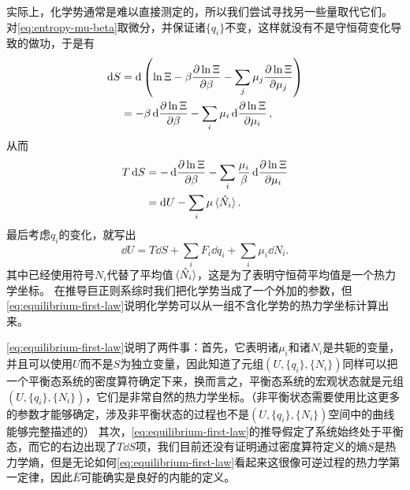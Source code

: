 \documentclass[hyperref, UTF8, a4paper]{ctexart}
\begin{document}
实际上，化学势通常是难以直接测定的，所以我们尝试寻找另一些量取代它们。
对\eqref{eq:entropy-mu-beta}取微分，并保证诸$\{q_i\}$不变，这样就没有不是守恒荷变化导致的做功，于是有
\[
    \begin{aligned}
        \dd{S} &= \dd{\left(\ln \Xi - \beta \pdv{\ln \Xi}{\beta} - \sum_j \mu_j \pdv{\ln \Xi}{\mu_j}\right)} \\
        &= - \beta \dd{\pdv{\ln \Xi}{\beta}} - \sum_i \mu_i \dd{\pdv{\ln \Xi}{\mu_i}},
    \end{aligned}
\]
从而
\[
    \begin{aligned}
        T \dd{S} &= - \dd{\pdv{\ln \Xi}{\beta}} - \sum_i \frac{\mu_i}{\beta} \dd{\pdv{\ln \Xi}{\mu_i}} \\
        &= \dd{U} - \sum_i \mu \expval*{\hat{N}_i}.
    \end{aligned}
\]
最后考虑$q_i$的变化，就写出
\begin{equation}
    \dd{U} = T \dd{S} + \sum_i F_i \dd{q_i} + \sum_i \mu_i \dd{N_i}.
    \label{eq:equilibrium-first-law}
\end{equation}
其中已经使用符号$N_i$代替了平均值$\expval*{\hat{N}_i}$，这是为了表明守恒荷平均值是一个热力学坐标。
在推导巨正则系综时我们把化学势当成了一个外加的参数，但\eqref{eq:equilibrium-first-law}说明化学势可以从一组不含化学势的热力学坐标计算出来。

\eqref{eq:equilibrium-first-law}说明了两件事：首先，它表明诸$\mu_i$和诸$N_i$是共轭的变量，并且可以使用$U$而不是$S$为独立变量，因此知道了元组$(U, \{q_i\}, \{N_i\})$同样可以把一个平衡态系统的密度算符确定下来，换而言之，平衡态系统的宏观状态就是元组$(U, \{q_i\}, \{N_i\})$，它们是非常自然的热力学坐标。（非平衡状态需要使用比这更多的参数才能够确定，涉及非平衡状态的过程也不是$(U, \{q_i\}, \{N_i\})$空间中的曲线能够完整描述的）
其次，\eqref{eq:equilibrium-first-law}的推导假定了系统始终处于平衡态，而它的右边出现了$T\dd{S}$项，我们目前还没有证明通过密度算符定义的熵$S$是热力学熵，但是无论如何\eqref{eq:equilibrium-first-law}看起来这很像可逆过程的热力学第一定律，因此$\bar{E}$可能确实是良好的内能的定义。
\end{document}
